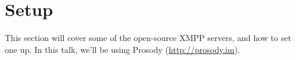 \part{Setup}

\newpage
This section will cover some of the open-source XMPP servers, and
how to set one up.  In this talk, we'll be using Prosody (\url{http://prosody.im}).
